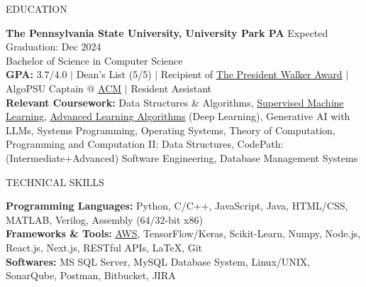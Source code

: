 \documentclass{resume} %
\begin{document}

\begin{rSection}{EDUCATION}

{\bf The Pennsylvania State University, University Park PA} \hfill {Expected Graduation: Dec $2024$}\\
{Bachelor of Science in Computer Science}\\
{\bf GPA:} $3.7/4.0$ $\vert$ Dean's List (5/5) $\vert$ Recipient of \href{https://awardsrecognition.psu.edu/student/undergraduate-scholastic-awards/}{The President Walker Award} $\vert$ AlgoPSU Captain @ \href{https://acm.psu.edu/algopsu/}{ACM} $\vert$ Resident Assistant\\
{\bf Relevant Coursework:} Data Structures \& Algorithms, \href{https://www.coursera.org/account/accomplishments/verify/JYX5UB5YP4YD}{Supervised Machine Learning}, \href{https://www.coursera.org/account/accomplishments/records/PBF4QN2KQL4Z}{Advanced Learning Algorithms} (Deep Learning), Generative AI with LLMs, Systems Programming, Operating Systems, Theory of Computation, Programming and Computation II: Data Structures, CodePath: (Intermediate+Advanced) Software Engineering, Database Management Systems
\end{rSection}


\begin{rSection}{TECHNICAL SKILLS}

{\bf Programming Languages:} Python, C/C++, JavaScript, Java, HTML/CSS, MATLAB, Verilog, Assembly ($64/32$-bit x$86$)\\
{\bf Frameworks \& Tools:} \href{https://www.coursera.org/account/accomplishments/verify/7L8L8YQTMCPZ}{AWS}, TensorFlow/Keras, Scikit-Learn, Numpy, Node.js, React.js, Next.js, RESTful APIs, \LaTeX, Git\\
{\bf Softwares:} MS SQL Server, MySQL Database System, Linux/UNIX, SonarQube, Postman, Bitbucket, JIRA

\end{rSection}
\end{document}
